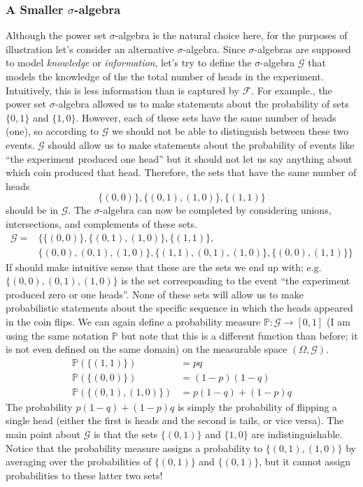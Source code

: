 \documentclass[12pt]{article}
\newcommand{\Prob}{\mathbb{P}}
\begin{document}
\subsubsection{A Smaller $\sigma$-algebra}
Although the power set $\sigma$-algebra is the natural choice here, for the purposes of illustration let's consider an alternative 
$\sigma$-algebra. Since $\sigma$-algebras are supposed to model \textit{knowledge} or \textit{information}, let's try to define the $\sigma$-algebra $\mathcal{G}$ that models the knowledge of the the total number 
of heads in the experiment. Intuitively, this is less information than is captured by $\mathcal{F}$. For example., the power set $\sigma$-algebra allowed us to make statements about the probability of sets $\{0, 1\}$ and 
$\{1, 0\}$. However, each of these sets have the same number of heads (one), so according to $\mathcal{G}$ we should not be able to distinguish between these two events. $\mathcal{G}$ should allow us to make statements 
about the probability of events like ``the experiment produced one head'' but it should not let us say anything about which coin produced that head. Therefore, the sets that have the same number of heads
\[\{(0, 0)\}, \{(0, 1), (1, 0)\}, \{(1, 1)\}\] 
should be in $\mathcal{G}$. The $\sigma$-algebra can now be completed by considering unions, intersections, and complements of these sets.
\begin{align*}
\mathcal{G} = &\{\{(0, 0)\}, \{(0, 1), (1, 0)\}, \{(1, 1)\}, \\
		       &\{(0, 0), (0, 1), (1, 0)\}, \{(1, 1), (0, 1), (1, 0)\}, \{(0, 0), (1, 1)\} \}
\end{align*}
If should make intuitive sense that these are the sets we end up with; e.g. $\{(0, 0), (0, 1), (1, 0)\}$ is the set corresponding to the event ``the experiment produced zero or one heads''. None of these sets will allow us to make 
probabilistic statements about the specific sequence in which the heads appeared in the coin flips. We can again define a probability measure $\Prob: \mathcal{G} \to [0, 1]$ (I am using the same notation $\Prob$ but note that 
this is a different function than before; it is not even defined on the same domain) on the measurable space $(\Omega, \mathcal{G})$. 
\begin{align*}
\Prob(\{(1, 1)\}) &= pq \\
\Prob(\{(0, 0)\}) &= (1 - p)(1 - q) \\
\Prob(\{(0, 1), (1, 0)\}) &= p(1 - q) + (1 - p)q
\end{align*}
The probability $p(1 - q) + (1 - p)q$ is simply the probability of flipping a single head (either the first is heads and the second is tails, or vice versa). 
The main point about $\mathcal{G}$ is that the sets $\{(0, 1)\}$ and $\{1, 0\}$ are indistinguishable. Notice that the probability measure assigns a probability to $\{(0, 1), (1, 0)\}$ by averaging over the probabilities 
of $\{(0, 1)\}$ and $\{(0, 1)\}$, but it cannot assign probabilities to these latter two sets! 
\end{document}
